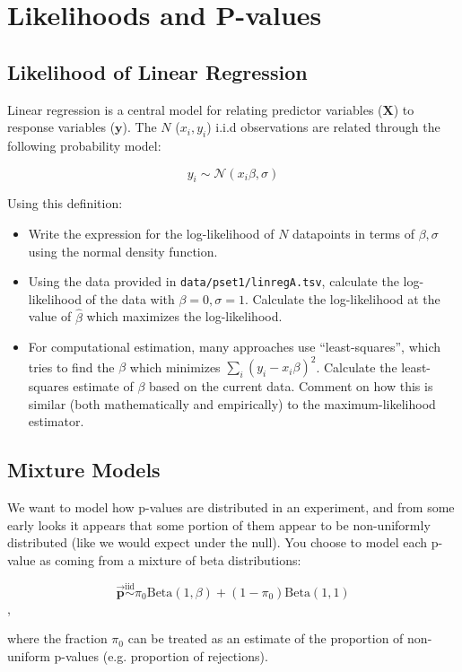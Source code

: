 \documentclass{pset}
\begin{document}
\section*{Likelihoods and P-values}

\subsection*{Likelihood of Linear Regression}

Linear regression is a central model for relating predictor variables ($\mathbf{X}$) to response variables ($\mathbf{y}$). The $N$ ($x_i, y_i$) i.i.d observations are related through the following probability model: 

$$y_i \sim \mathcal{N}(x_i\beta, \sigma)$$ 

Using this definition:

\begin{itemize}
\item Write the expression for the log-likelihood of $N$ datapoints in terms of $\beta, \sigma$ using the normal density function.
\item Using the data provided in \texttt{data/pset1/linregA.tsv}, calculate the log-likelihood of the data with $\beta = 0,\sigma=1$. Calculate the log-likelihood at the value of $\hat{\beta}$ which maximizes the log-likelihood. 
\item For computational estimation, many approaches use ``least-squares'', which tries to find the $\beta$ which minimizes $\sum_i (y_i - x_i\beta)^2$. Calculate the least-squares estimate of $\beta$ based on the current data. Comment on how this is similar (both mathematically and empirically) to the maximum-likelihood estimator.
\end{itemize}

\subsection*{Mixture Models}

We want to model how p-values are distributed in an experiment, and from some early looks it appears that some portion of them appear to be non-uniformly distributed (like we would expect under the null). You choose to model each p-value as coming from a mixture of beta distributions:

$$\overrightarrow{\mathbf{p}} \overset{\text{iid}}{\sim} \pi_0 \text{Beta}(1, \beta) + (1 - \pi_0)\text{Beta}(1,1)$$, 

where the fraction $\pi_0$ can be treated as an estimate of the proportion of non-uniform p-values (e.g. proportion of rejections).
\end{document}
